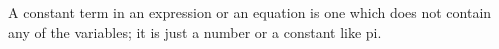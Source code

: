 A constant term in an expression or an equation is one which does
not contain any of the variables; it is just a number or a 
constant like pi.